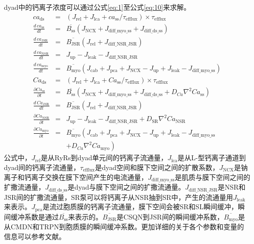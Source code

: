 dyad中的钙离子浓度可以通过公式\ref{eq:1}至公式\ref{eq:10}来求解。
{
\allowdisplaybreaks
 \begin{eqnarray}
  ca_{\mathrm{ds}}& = & (J_{\mathrm{rel}} + J_{\mathrm{lca}} + ca_{\mathrm{ss}} / \tau_{\mathrm{efflux}})\times \tau_{\mathrm{efflux}}\label{eq:1}\\
  \frac{d\, ca_{\mathrm{ss}}}{dt}& = & \overline{B_{\mathrm{ss}}}\left(  J_{\mathrm{NCX}} + J_{\mathrm{diff\_myo\_ss}} + J_{\mathrm{diff\_ds\_ss}}\right) \label{eq:2}\\
  \frac{d\,ca_{\mathrm{JSR}}}{dt}& = & \overline{B_{\mathrm{JSR}}}\left(J_{\mathrm{rel}} + J_{\mathrm{diff\_NSR\_JSR}}\right) \label{eq:3}\\
  \frac{d\,ca_{\mathrm{NSR}}}{dt}& = & J_{\mathrm{up}} - J_{\mathrm{leak}} - J_{\mathrm{diff\_NSR\_JSR}}  \label{eq:4}\\ 
  \frac{d\,ca_{\mathrm{myo}}}{dt}& = & \overline{B_{\mathrm{myo}}}\left(J_{\mathrm{cab}} + J_{\mathrm{pca}} + J_{\mathrm{NCX}} - J_{\mathrm{up}} + J_{\mathrm{leak}} - J_{\mathrm{diff\_myo\_ss}}\right) \label{eq:5}\\
  Ca_{\mathrm{ds}}& = & (J_{\mathrm{rel}} + J_{\mathrm{lca}} + Ca_{\mathrm{ss}} / \tau_{\mathrm{efflux}})\times \tau_{\mathrm{efflux}}\label{eq:6}\\  
  \frac{\partial Ca_{\mathrm{ss}}}{\partial t}& = & \overline{B_{\mathrm{ss}}} \left(J_{\mathrm{NCX}} + J_{\mathrm{diff\_myo\_ss}} + J_{\mathrm{diff\_ds\_ss}}
+ D_{Ca}\nabla^2Ca_{\mathrm{ss}}\right) \label{eq:7}\\
  \frac{d\,Ca_{\mathrm{JSR}}}{dt}& = & \overline{B_{\mathrm{JSR}}}\left(J_{\mathrm{rel}} + J_{\mathrm{diff\_NSR\_JSR}}\right) \label{eq:8}\\
  \frac{\partial Ca_{\mathrm{NSR}}}{\partial t}& = & J_{\mathrm{up}} - J_{\mathrm{leak}} - J_{\mathrm{diff\_NSR\_JSR}}  +  D_{\mathrm{SR}}\nabla^2 Ca_{\mathrm{NSR}}\label{eq:9}\\					
  \frac{\partial Ca_{\mathrm{myo}}}{\partial t}& = &
                                                     \overline{B_\mathrm{myo}}\left(J_\mathrm{cab} + J_\mathrm{pca} + J_\mathrm{NCX} - J_\mathrm{up} + J_\mathrm{leak} - J_\mathrm{diff\_myo\_ss}\right.\nonumber\\
&&+ \left. D_{Ca}\nabla^2Ca_{\mathrm{myo}}\right)
\label{eq:10}
  \end{eqnarray}
}
%
公式中，$J_{\mathrm{rel}}$是从RyRs到dyad单元间的钙离子流通量，$J_{\mathrm{lca}}$是从L-型钙离子通道到dyad间的钙离子流通量，$\tau_{\mathrm{efflux}}$是dyad空间和膜下空间之间的扩散系数，$J_{\mathrm{NCX}}$是钠离子和钙离子交换在膜下空间产生的电流通量，$J_{\mathrm{diff\_myo\_ss}}$是肌质与膜下空间之间的扩撒流通量，$J_{\mathrm{diff\_ds\_ss}}$是dyad与膜下空间之间的扩撒流通量。$J_{\mathrm{diff\_NSR\_JSR}}$是NSR和JSR间的扩撒流通量，SR泵可以将钙离子从NSR抽到SR中，产生的流通量用$J_{\mathrm{leak}}$来表示。$J_{\mathrm{pca}}$是流过胞质膜的钙离子流通量，膜下空间会被SR和SL瞬间缓冲，瞬间缓冲系数是通过$\overline{B_{\mathrm{ss}}}$来表示的。$\overline{B_{\mathrm{JSR}}}$是CSQN到JSR间的瞬间缓冲系数，$\overline{B_{\mathrm{myo}}}$是从CMDN和TRPN到胞质膜的瞬间缓冲系数。更加详细的关于各个参数和变量的信息可以参考文献。

